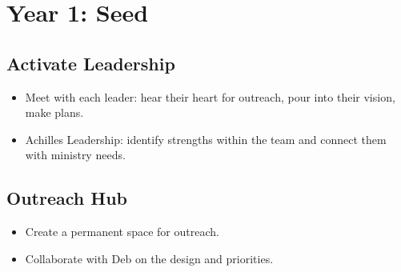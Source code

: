 \section*{Year 1: Seed 🌰}

\subsection{Activate Leadership}
\begin{itemize}
  \item Meet with each leader: hear their heart for outreach, pour into their vision, make plans.
  \item Achilles Leadership: identify strengths within the team and connect them with ministry needs.
\end{itemize}

\subsection{Outreach Hub}
\begin{itemize}
  \item Create a permanent space for outreach.
  \item Collaborate with Deb on the design and priorities.
\end{itemize}

